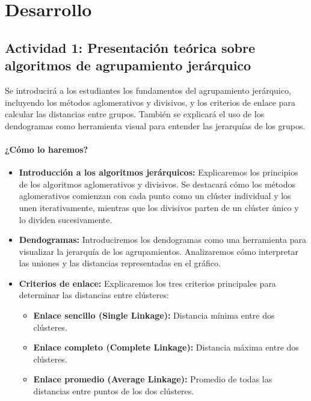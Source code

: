 \documentclass[a4,11pt]{aleph-notas}
\begin{document}
\section*{Desarrollo}

\subsection*{Actividad 1: Presentación teórica sobre algoritmos de agrupamiento jerárquico}

Se introducirá a los estudiantes los fundamentos del agrupamiento jerárquico, incluyendo los métodos aglomerativos y divisivos, y los criterios de enlace para calcular las distancias entre grupos. También se explicará el uso de los dendogramas como herramienta visual para entender las jerarquías de los grupos.

\paragraph{¿Cómo lo haremos?}  
\begin{itemize}[leftmargin=*]
    \item \textbf{Introducción a los algoritmos jerárquicos:}  
    Explicaremos los principios de los algoritmos aglomerativos y divisivos. Se destacará cómo los métodos aglomerativos comienzan con cada punto como un clúster individual y los unen iterativamente, mientras que los divisivos parten de un clúster único y lo dividen sucesivamente.
    
    \item \textbf{Dendogramas:}  
    Introduciremos los dendogramas como una herramienta para visualizar la jerarquía de los agrupamientos. Analizaremos cómo interpretar las uniones y las distancias representadas en el gráfico.
    
    \item \textbf{Criterios de enlace:}  
    Explicaremos los tres criterios principales para determinar las distancias entre clústeres:
    \begin{itemize}
        \item \textbf{Enlace sencillo (Single Linkage):} Distancia mínima entre dos clústeres.
        \item \textbf{Enlace completo (Complete Linkage):} Distancia máxima entre dos clústeres.
        \item \textbf{Enlace promedio (Average Linkage):} Promedio de todas las distancias entre puntos de los dos clústeres.
    \end{itemize}

\end{itemize}
\end{document}

